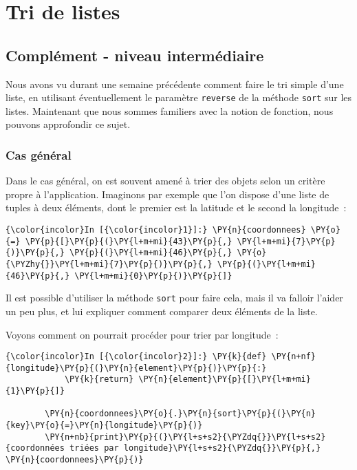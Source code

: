     
    
    
    

    

    \hypertarget{tri-de-listes}{%
\section{Tri de listes}\label{tri-de-listes}}

    \hypertarget{compluxe9ment---niveau-intermuxe9diaire}{%
\subsection{Complément - niveau
intermédiaire}\label{compluxe9ment---niveau-intermuxe9diaire}}

    Nous avons vu durant une semaine précédente comment faire le tri simple
d'une liste, en utilisant éventuellement le paramètre \texttt{reverse}
de la méthode \texttt{sort} sur les listes. Maintenant que nous sommes
familiers avec la notion de fonction, nous pouvons approfondir ce sujet.

    \hypertarget{cas-guxe9nuxe9ral}{%
\subsubsection{Cas général}\label{cas-guxe9nuxe9ral}}

    Dans le cas général, on est souvent amené à trier des objets selon un
critère propre à l'application. Imaginons par exemple que l'on dispose
d'une liste de tuples à deux éléments, dont le premier est la latitude
et le second la longitude~:

    \begin{Verbatim}[commandchars=\\\{\}]
{\color{incolor}In [{\color{incolor}1}]:} \PY{n}{coordonnees} \PY{o}{=} \PY{p}{[}\PY{p}{(}\PY{l+m+mi}{43}\PY{p}{,} \PY{l+m+mi}{7}\PY{p}{)}\PY{p}{,} \PY{p}{(}\PY{l+m+mi}{46}\PY{p}{,} \PY{o}{\PYZhy{}}\PY{l+m+mi}{7}\PY{p}{)}\PY{p}{,} \PY{p}{(}\PY{l+m+mi}{46}\PY{p}{,} \PY{l+m+mi}{0}\PY{p}{)}\PY{p}{]}
\end{Verbatim}


    Il est possible d'utiliser la méthode \texttt{sort} pour faire cela,
mais il va falloir l'aider un peu plus, et lui expliquer comment
comparer deux éléments de la liste.

Voyons comment on pourrait procéder pour trier par longitude~:

    \begin{Verbatim}[commandchars=\\\{\}]
{\color{incolor}In [{\color{incolor}2}]:} \PY{k}{def} \PY{n+nf}{longitude}\PY{p}{(}\PY{n}{element}\PY{p}{)}\PY{p}{:} 
            \PY{k}{return} \PY{n}{element}\PY{p}{[}\PY{l+m+mi}{1}\PY{p}{]}
        
        \PY{n}{coordonnees}\PY{o}{.}\PY{n}{sort}\PY{p}{(}\PY{n}{key}\PY{o}{=}\PY{n}{longitude}\PY{p}{)}
        \PY{n+nb}{print}\PY{p}{(}\PY{l+s+s2}{\PYZdq{}}\PY{l+s+s2}{coordonnées triées par longitude}\PY{l+s+s2}{\PYZdq{}}\PY{p}{,} \PY{n}{coordonnees}\PY{p}{)}
\end{Verbatim}


